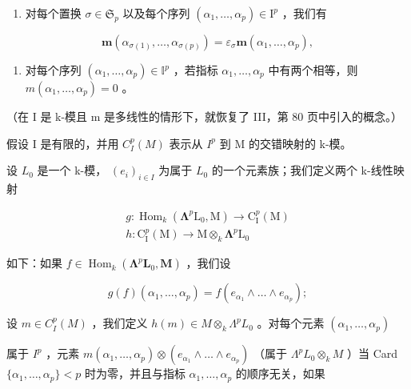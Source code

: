 \begin{enumerate}
\def\labelenumi{\alph{enumi})}
\tightlist
\item
  对每个置换 \(\sigma \in \mathfrak{S}_p\) 以及每个序列 \((\alpha_1, \ldots, \alpha_p) \in \mathrm{I}^p\) ，我们有
\end{enumerate}

\[
\boldsymbol {m} \left(\alpha_ {\sigma (1)}, \dots , \alpha_ {\sigma (p)}\right) = \varepsilon_ {\sigma} \boldsymbol {m} \left(\alpha_ {1}, \dots , \alpha_ {p}\right),
\]

\begin{enumerate}
\def\labelenumi{\alph{enumi})}
\setcounter{enumi}{1}
\tightlist
\item
  对每个序列 \((\alpha_{1},\ldots,\alpha_{p})\in\mathbb{I}^{p}\) ，若指标 \(\alpha_{1},\ldots,\alpha_{p}\) 中有两个相等，则 \(m(\alpha_{1},\ldots,\alpha_{p})=0\) 。
\end{enumerate}

（在 I 是 k-模且 m 是多线性的情形下，就恢复了 III，第 80 页中引入的概念。）

假设 I 是有限的，并用 \(C_{I}^{p}(M)\) 表示从 \(I^{p}\) 到 M 的交错映射的 k-模。

设 \(L_{0}\) 是一个 k-模， \((e_{i})_{i\in I}\) 为属于 \(L_{0}\) 的一个元素族；我们定义两个 k-线性映射

\[
\begin{array}{l} g: \operatorname{Hom} _ {k} (\symbf {\Lambda} ^ {p} \mathrm{L} _ {0}, \mathrm{M}) \to \mathrm{C} _ {\mathrm{I}} ^ {p} (\mathrm{M}) \\ h: \mathrm{C} _ {\mathrm{I}} ^ {p} (\mathrm{M}) \to \mathrm{M} \otimes_ {k} \symbf {\Lambda} ^ {p} \mathrm{L} _ {0} \end{array}
\]

如下：如果 \(f \in \operatorname{Hom}_k(\symbf{\Lambda}^p \mathbf{L}_0, \mathbf{M})\) ，我们设

\[
g (f) (\alpha_ {1}, \dots , \alpha_ {p}) = f (e _ {\alpha_ {1}} \wedge \dots \wedge e _ {\alpha_ {p}});
\]

设 \(m \in C_{I}^{p}(M)\) ，我们定义 \(h(m) \in M \otimes_{k} \Lambda^{p} L_{0}\) 。对每个元素 \((\alpha_{1}, \ldots, \alpha_{p})\)

属于 \(I^{p}\) ，元素 \(m(\alpha_{1},\ldots,\alpha_{p})\otimes(e_{\alpha_{1}}\wedge\ldots\wedge e_{\alpha_{p}})\) （属于 \(\Lambda^{p}L_{0}\otimes_{k}M\) ）当 Card \(\{\alpha_{1},\ldots,\alpha_{p}\}<p\) 时为零，并且与指标 \(\alpha_{1},\ldots,\alpha_{p}\) 的顺序无关，如果

